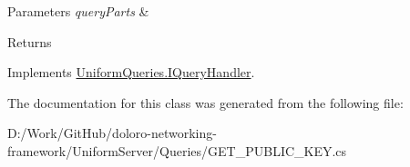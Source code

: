 \begin{DoxyParams}{Parameters}
{\em query\+Parts} & \\
\hline
\end{DoxyParams}
\begin{DoxyReturn}{Returns}

\end{DoxyReturn}


Implements \mbox{\hyperlink{interface_uniform_queries_1_1_i_query_handler_abda1ccf47ad2889fbd015955965046e7}{Uniform\+Queries.\+I\+Query\+Handler}}.



The documentation for this class was generated from the following file\+:\begin{DoxyCompactItemize}
\item 
D\+:/\+Work/\+Git\+Hub/doloro-\/networking-\/framework/\+Uniform\+Server/\+Queries/G\+E\+T\+\_\+\+P\+U\+B\+L\+I\+C\+\_\+\+K\+E\+Y.\+cs\end{DoxyCompactItemize}
